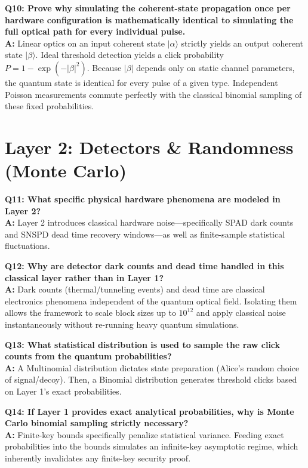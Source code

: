\documentclass[11pt, a4paper]{article}
\begin{document}
\textbf{Q10: Prove why simulating the coherent-state propagation once per hardware configuration is mathematically identical to simulating the full optical path for every individual pulse.} \\
\textbf{A:} Linear optics on an input coherent state $|\alpha\rangle$ strictly yields an output coherent state $|\beta\rangle$. Ideal threshold detection yields a click probability $P = 1 - \exp(-|\beta|^2)$. Because $|\beta|$ depends only on static channel parameters, the quantum state is identical for every pulse of a given type. Independent Poisson measurements commute perfectly with the classical binomial sampling of these fixed probabilities.

\section{Layer 2: Detectors \& Randomness (Monte Carlo)}

\textbf{Q11: What specific physical hardware phenomena are modeled in Layer 2?} \\
\textbf{A:} Layer 2 introduces classical hardware noise—specifically SPAD dark counts and SNSPD dead time recovery windows—as well as finite-sample statistical fluctuations.

\textbf{Q12: Why are detector dark counts and dead time handled in this classical layer rather than in Layer 1?} \\
\textbf{A:} Dark counts (thermal/tunneling events) and dead time are classical electronics phenomena independent of the quantum optical field. Isolating them allows the framework to scale block sizes up to $10^{12}$ and apply classical noise instantaneously without re-running heavy quantum simulations.

\textbf{Q13: What statistical distribution is used to sample the raw click counts from the quantum probabilities?} \\
\textbf{A:} A Multinomial distribution dictates state preparation (Alice's random choice of signal/decoy). Then, a Binomial distribution generates threshold clicks based on Layer 1's exact probabilities.

\textbf{Q14: If Layer 1 provides exact analytical probabilities, why is Monte Carlo binomial sampling strictly necessary?} \\
\textbf{A:} Finite-key bounds specifically penalize statistical variance. Feeding exact probabilities into the bounds simulates an infinite-key asymptotic regime, which inherently invalidates any finite-key security proof.
\end{document}
